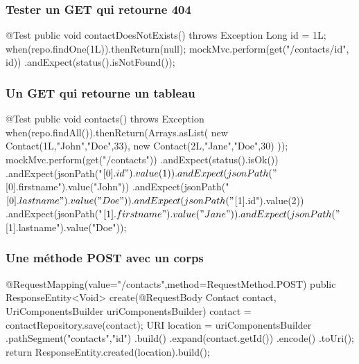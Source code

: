 \begin{frame}[fragile]
 \frametitle{Tester un GET qui retourne 404}

 \begin{javacode}
@Test
public void contactDoesNotExists() throws Exception {
    Long id = 1L;
    when(repo.findOne(1L)).thenReturn(null);
    mockMvc.perform(get("/contacts/{id}", id))
            .andExpect(status().isNotFound());
}
 \end{javacode}

\end{frame}



\begin{frame}[fragile]
 \frametitle{Un GET qui retourne un tableau}

 \begin{textcode}
 \end{textcode}

 \begin{javacode}
@Test public void contacts() throws Exception {
    when(repo.findAll()).thenReturn(Arrays.asList(
            new Contact(1L,"John","Doe",33),
            new Contact(2L,"Jane","Doe",30)
    ));
    mockMvc.perform(get("/contacts"))
        .andExpect(status().isOk())
        .andExpect(jsonPath("$[0].id").value(1))
        .andExpect(jsonPath("$[0].firstname").value("John"))
        .andExpect(jsonPath("$[0].lastname").value("Doe"))
        .andExpect(jsonPath("$[1].id").value(2))
        .andExpect(jsonPath("$[1].firstname").value("Jane"))
        .andExpect(jsonPath("$[1].lastname").value("Doe"));
}
 \end{javacode}

\end{frame}

\begin{frame}[fragile]
 \frametitle{Une méthode POST avec un corps}

 \begin{javacode}
@RequestMapping(value="/contacts",method=RequestMethod.POST)
public ResponseEntity<Void> create(@RequestBody Contact contact,
                         UriComponentsBuilder uriComponentsBuilder) {
 contact = contactRepository.save(contact);
 URI location = uriComponentsBuilder
   .pathSegment("contacts","{id}")
   .build()
   .expand(contact.getId())
   .encode()
   .toUri();
  return ResponseEntity.created(location).build();
}
 \end{javacode}

\end{frame}

